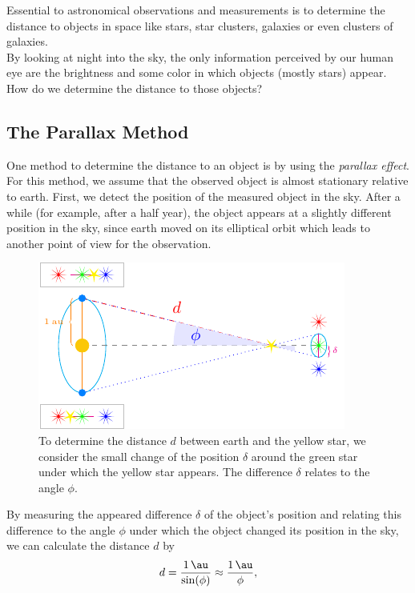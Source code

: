 Essential to astronomical observations and measurements is to determine the distance to objects in space like stars, star clusters, galaxies or even clusters of galaxies. \\
By looking at night into the sky, the only information perceived by our human eye are the brightness and some color in which objects (mostly stars) appear.
How do we determine the distance to those objects?


\subsection{The Parallax Method}

One method to determine the distance to an object is by using the \textit{parallax effect}. \\
For this method, we assume that the observed object is almost stationary relative to earth.
First, we detect the position of the measured object in the sky. After a while (for example, after a half year), the object appears at a slightly different position in the sky, since earth moved on its elliptical orbit which leads to another point of view for the observation.
\begin{figure}[H]
    \centering
    \includegraphics[scale=1.8]{figures/tikz/parallax/parallax.pdf}
    \caption{To determine the distance $d$ between earth and the yellow star, we consider the small change of the position $\delta$ around the green star under which the yellow star appears. The difference $\delta$ relates to the angle $\phi$.}
    \label{fig:parallax}
\end{figure}
\noindent By measuring the appeared difference $\delta$ of the object's position and relating this difference to the angle $\phi$ under which the object changed its position in the sky, we can calculate the distance $d$ by 
\begin{align}
    d = \frac{\SI{1}{\au}}{\sin(\phi)} \approx \frac{\SI{1}{\au}}{\phi},
\end{align}
